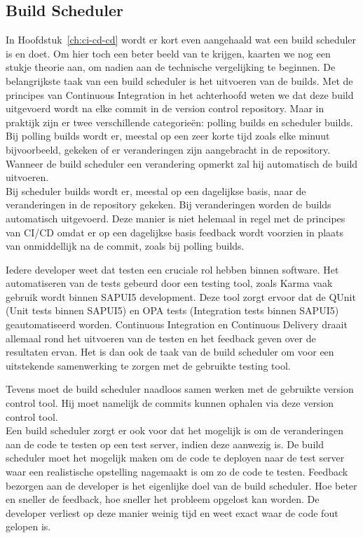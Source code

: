         \subsection{Build Scheduler}
        In Hoofdstuk~\ref{ch:ci-cd-cd} wordt er kort even aangehaald wat een build scheduler is en doet. Om hier toch een beter beeld van te krijgen, kaarten we nog een stukje theorie aan, om nadien aan de technische vergelijking te beginnen.
        De belangrijkste taak van een build scheduler is het uitvoeren van de builds. Met de principes van Continuous Integration in het achterhoofd weten we dat deze build uitgevoerd wordt na elke commit in de version control repository. Maar in praktijk zijn er twee verschillende categorieën: polling builds en scheduler builds.\\
        Bij polling builds wordt er, meestal op een zeer korte tijd zoals elke minuut bijvoorbeeld, gekeken of er veranderingen zijn aangebracht in de repository. Wanneer de build scheduler een verandering opmerkt zal hij automatisch de build uitvoeren.\\
        Bij scheduler builds wordt er, meestal op een dagelijkse basis, naar de veranderingen in de repository gekeken. Bij veranderingen worden de builds automatisch uitgevoerd. Deze manier is niet helemaal in regel met de principes van CI/CD omdat er op een dagelijkse basis feedback wordt voorzien in plaats van onmiddellijk na de commit, zoals bij polling builds.
        
        Iedere developer weet dat testen een cruciale rol hebben binnen software. Het automatiseren van de tests gebeurd door een testing tool, zoals Karma vaak gebruik wordt binnen SAPUI5 development. Deze tool zorgt ervoor dat de QUnit (Unit tests binnen SAPUI5) en OPA tests (Integration tests binnen SAPUI5) geautomatiseerd worden. Continuous Integration en Continuous Delivery draait allemaal rond het uitvoeren van de testen en het feedback geven over de resultaten ervan. Het is dan ook de taak van de build scheduler om voor een uitstekende samenwerking te zorgen met de gebruikte testing tool.
        
        Tevens moet de build scheduler naadloos samen werken met de gebruikte version control tool. Hij moet namelijk de commits kunnen ophalen via deze version control tool.\\
        Een build scheduler zorgt er ook voor dat het mogelijk is om de veranderingen aan de code te testen op een test server, indien deze aanwezig is. De build scheduler moet het mogelijk maken om de code te deployen naar de test server waar een realistische opstelling nagemaakt is om zo de code te testen.
        Feedback bezorgen aan de developer is het eigenlijke doel van de build scheduler. Hoe beter en sneller de feedback, hoe sneller het probleem opgelost kan worden. De developer verliest op deze manier weinig tijd en weet exact waar de code fout gelopen is.
        
